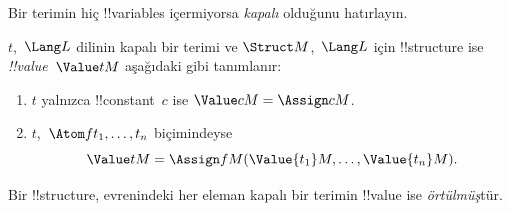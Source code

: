 \documentclass[../../../include/open-logic-section]{subfiles}
\begin{document}


\begin{explain}
Bir terimin hiç !!{variable}s içermiyorsa \emph{kapalı} olduğunu
hatırlayın.
\end{explain}

\begin{defn}
$t$,~$\Lang L$ dilinin kapalı bir terimi ve $\Struct M$,~$\Lang L$
için !!{structure} ise \emph{!!{value}}~$\Value tM$ aşağıdaki gibi
tanımlanır:
\begin{enumerate}
\item $t$ yalnızca !!{constant}~$c$ ise $\Value cM=\Assign cM$.
\item $t$,~$\Atom f{t_1,\ldots,t_n}$ biçimindeyse
  \[
  \Value tM=\Assign fM(\Value{t_1}M,\ldots,\Value{t_n}M).
  \]
\end{enumerate}
\end{defn}

\begin{defn}
Bir !!{structure}, evrenindeki her eleman kapalı bir terimin
!!{value} ise \emph{örtülmüş}tür.
\end{defn}
\end{document}
